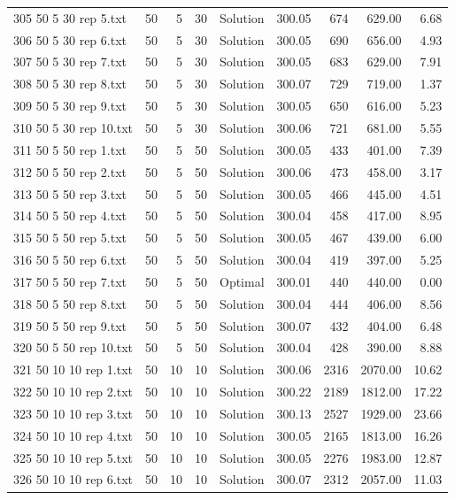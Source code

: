 \begin{longtable}{lrrllrrrr}
305 50 5 30 rep 5.txt & 50 & 5 & 30 & Solution & 300.05 & 674 & 629.00 &  6.68\\
306 50 5 30 rep 6.txt & 50 & 5 & 30 & Solution & 300.05 & 690 & 656.00 &  4.93\\
307 50 5 30 rep 7.txt & 50 & 5 & 30 & Solution & 300.05 & 683 & 629.00 &  7.91\\
308 50 5 30 rep 8.txt & 50 & 5 & 30 & Solution & 300.07 & 729 & 719.00 &  1.37\\
309 50 5 30 rep 9.txt & 50 & 5 & 30 & Solution & 300.05 & 650 & 616.00 &  5.23\\
310 50 5 30 rep 10.txt & 50 & 5 & 30 & Solution & 300.06 & 721 & 681.00 &  5.55\\
311 50 5 50 rep 1.txt & 50 & 5 & 50 & Solution & 300.05 & 433 & 401.00 &  7.39\\
312 50 5 50 rep 2.txt & 50 & 5 & 50 & Solution & 300.06 & 473 & 458.00 &  3.17\\
313 50 5 50 rep 3.txt & 50 & 5 & 50 & Solution & 300.05 & 466 & 445.00 &  4.51\\
314 50 5 50 rep 4.txt & 50 & 5 & 50 & Solution & 300.04 & 458 & 417.00 &  8.95\\
315 50 5 50 rep 5.txt & 50 & 5 & 50 & Solution & 300.05 & 467 & 439.00 &  6.00\\
316 50 5 50 rep 6.txt & 50 & 5 & 50 & Solution & 300.04 & 419 & 397.00 &  5.25\\
317 50 5 50 rep 7.txt & 50 & 5 & 50 & Optimal & 300.01 & 440 & 440.00 &  0.00\\
318 50 5 50 rep 8.txt & 50 & 5 & 50 & Solution & 300.04 & 444 & 406.00 &  8.56\\
319 50 5 50 rep 9.txt & 50 & 5 & 50 & Solution & 300.07 & 432 & 404.00 &  6.48\\
320 50 5 50 rep 10.txt & 50 & 5 & 50 & Solution & 300.04 & 428 & 390.00 &  8.88\\
321 50 10 10 rep 1.txt & 50 & 10 & 10 & Solution & 300.06 & 2316 & 2070.00 & 10.62\\
322 50 10 10 rep 2.txt & 50 & 10 & 10 & Solution & 300.22 & 2189 & 1812.00 & 17.22\\
323 50 10 10 rep 3.txt & 50 & 10 & 10 & Solution & 300.13 & 2527 & 1929.00 & 23.66\\
324 50 10 10 rep 4.txt & 50 & 10 & 10 & Solution & 300.05 & 2165 & 1813.00 & 16.26\\
325 50 10 10 rep 5.txt & 50 & 10 & 10 & Solution & 300.05 & 2276 & 1983.00 & 12.87\\
326 50 10 10 rep 6.txt & 50 & 10 & 10 & Solution & 300.07 & 2312 & 2057.00 & 11.03\\

\end{longtable}
